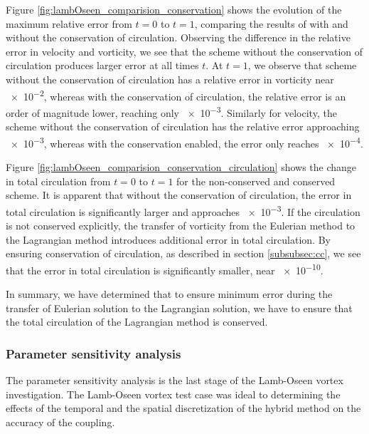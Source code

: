 Figure \ref{fig:lambOseen_comparision_conservation} shows the evolution of the maximum relative error from $t=0$ to $t=1$, comparing the results of with and without the conservation of circulation. Observing the difference in the relative error in velocity and vorticity, we see that the scheme without the conservation of circulation produces larger error at all times $t$. At $t=1$, we observe that scheme without the conservation of circulation has a relative error in vorticity near \num{e-2}, whereas with the conservation of circulation, the relative error is an order of magnitude lower, reaching only \num{e-3}. Similarly for velocity, the scheme without the conservation of circulation has the relative error approaching \num{e-3}, whereas with the conservation enabled, the error only reaches \num{e-4}. 

Figure \ref{fig:lambOseen_comparision_conservation_circulation} shows the change in total circulation from $t=0$ to $t=1$ for the non-conserved and conserved scheme. It is apparent that without the conservation of circulation, the error in total circulation is significantly larger and approaches \num{e-3}. If the circulation is not conserved explicitly, the transfer of vorticity from the Eulerian method to the Lagrangian method introduces additional error in total circulation. By ensuring conservation of circulation, as described in section \ref{subsubsec:cc}, we see that the error in total circulation is significantly smaller, near \num{e-10}. %

In summary, we have determined that to ensure minimum error during the transfer of Eulerian solution to the Lagrangian solution, we have to ensure that the total circulation of the Lagrangian method is conserved.

\subsubsection{Parameter sensitivity analysis}
\label{subsubsec:psa}

The parameter sensitivity analysis is the last stage of the Lamb-Oseen vortex investigation. The Lamb-Oseen vortex test case was ideal to determining the effects of the temporal and the spatial discretization of the hybrid method on the accuracy of the coupling. 

